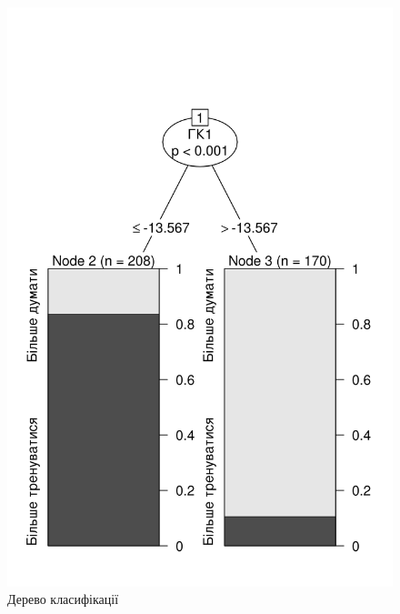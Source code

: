 \begin{figure}[h]
  \centering
    \includegraphics{images/tree}
  \caption{Дерево класифікації}
  \label{fig:tree:simple}
\end{figure}
